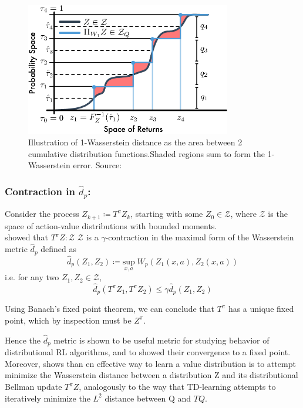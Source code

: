 \begin{figure}[ht]
    \centering
    \includegraphics[width=0.8\textwidth]{images/wasserstein.png}
    \caption{Illustration of 1-Wasserstein distance as the area between 2 cumulative distribution
    functions.Shaded regions sum to form the 1-Wasserstein error. Source: \citet{Dabney2018a}}
    \label{fig:wasserstein}

\end{figure}

\subsubsection{Contraction in $\hat{d}_p$:}
Consider the process $Z_{k+1} \coloneqq T^\pi Z_{k}$, starting with some $Z_{0} \in \mathcal{Z}$, 
where $\mathcal{Z}$  is the space of action-value distributions with bounded moments.\\
\cite{Bellemare2017} showed that
$T^\pi Z: \mathcal{Z}$  \ra $\mathcal{Z}$ is a $\gamma$-contraction in the maximal form of the Wasserstein
metric $\hat{d}_p$ defined as
\begin{equation}
    \hat{d}_p(Z_1,Z_2) \coloneqq \underset{x,a} {\text{sup}}  \;W_p(Z_1(x,a),Z_2(x,a))
\end{equation}
i.e. for any two $Z_1, Z_2 \in \mathcal{Z}$,
\begin{equation}
    \hat{d}_p(T^\pi Z_1, T^\pi Z_2) \leq \gamma \hat{d}_p(Z_1,Z_2)
\end{equation}

Using Banach's fixed point theorem, we can conclude that $T^\pi$ has a unique fixed point,
which by inspection must be $Z^\pi$.

Hence the $\hat{d}_p$ metric is shown to be useful metric for studying behavior of
distributional RL algorithms, and to showed their convergence to a fixed point.
Moreover, shows than en effective way to learn a value distribution is to attempt minimize
the Wasserstein distance between a distribution Z and its distributional Bellman update
$T^\pi Z$, analogously to the way that TD-learning attempts to iteratively minimize
the $L^2$ distance between Q and $TQ$.

